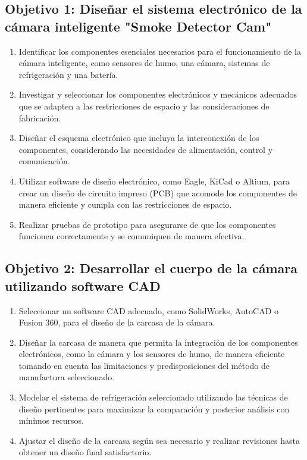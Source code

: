 \begin{minipage}{\linewidth}
    \subsection*{Objetivo 1: Diseñar el sistema electrónico de la cámara inteligente "Smoke Detector Cam"}

\begin{enumerate}[label=1.\arabic*]
    \item Identificar los componentes esenciales necesarios para el funcionamiento de la cámara inteligente, como sensores de humo, una cámara, sistemas de refrigeración y una batería.
    \item Investigar y seleccionar los componentes electrónicos y mecánicos adecuados que se adapten a las restricciones de espacio y las consideraciones de fabricación.
    \item Diseñar el esquema electrónico que incluya la interconexión de los componentes, considerando las necesidades de alimentación, control y comunicación.
    \item Utilizar software de diseño electrónico, como Eagle, KiCad o Altium, para crear un diseño de circuito impreso (PCB) que acomode los componentes de manera eficiente y cumpla con las restricciones de espacio.
    \item Realizar pruebas de prototipo para asegurarse de que los componentes funcionen correctamente y se comuniquen de manera efectiva.
\end{enumerate}

\subsection*{Objetivo 2: Desarrollar el cuerpo de la cámara utilizando software CAD}

\begin{enumerate}[label=2.\arabic*]
    \item Seleccionar un software CAD adecuado, como SolidWorks, AutoCAD o Fusion 360, para el diseño de la carcasa de la cámara.
    \item Diseñar la carcasa de manera que permita la integración de los componentes electrónicos, como la cámara y los sensores de humo, de manera eficiente tomando en cuenta las limitaciones y predisposiciones del método de manufactura seleccionado.
    \item Modelar el sistema de refrigeración seleccionado utilizando las técnicas de diseño pertinentes para maximizar la comparación y posterior análisis con mínimos recursos.
    \item Ajustar el diseño de la carcasa según sea necesario y realizar revisiones hasta obtener un diseño final satisfactorio.
\end{enumerate}


\end{minipage}
